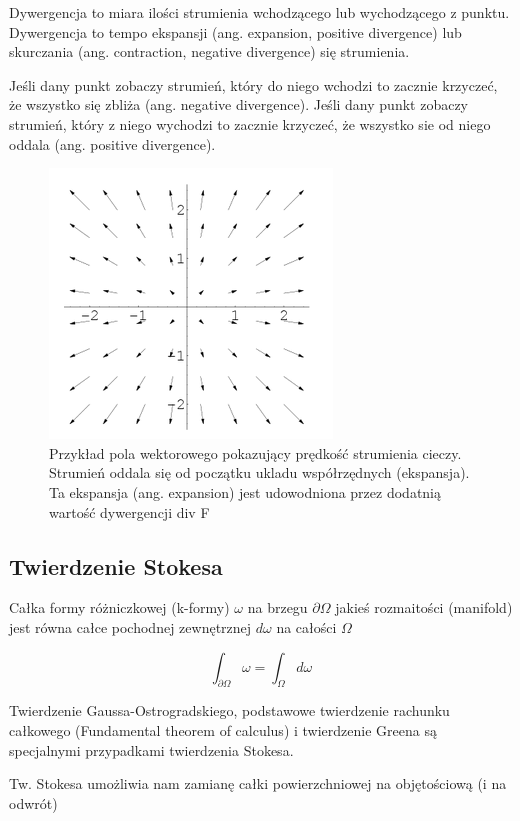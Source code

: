 \documentclass[12pt]{article}
\begin{document}
Dywergencja to miara ilości strumienia wchodzącego lub wychodzącego z punktu. Dywergencja to tempo ekspansji (ang. expansion, positive divergence) lub skurczania (ang. contraction, negative divergence) się strumienia.

Jeśli dany punkt zobaczy strumień, który do niego wchodzi to zacznie krzyczeć, że wszystko się zbliża (ang. negative divergence). Jeśli dany punkt zobaczy strumień, który z niego wychodzi to zacznie krzyczeć, że wszystko sie od niego oddala (ang. positive divergence).

\begin{figure}[H]
	\centering
	\includegraphics[scale=1.0]{Pictures/vector_field_div.png}
	\caption{Przykład pola wektorowego pokazujący prędkość strumienia cieczy. Strumień oddala się od początku ukladu współrzędnych (ekspansja). Ta ekspansja (ang. expansion) jest udowodniona przez dodatnią wartość dywergencji div F}
\end{figure}

\subsection{Twierdzenie Stokesa}
Całka formy różniczkowej (k-formy) $\omega$ na brzegu $\partial \Omega$ jakieś rozmaitości (manifold) jest równa całce pochodnej zewnętrznej $d \omega$ na całości $\Omega$

\begin{equation}
\int_{\partial \Omega} \omega = \int_{\Omega} d \omega
\end{equation}

Twierdzenie Gaussa-Ostrogradskiego, podstawowe twierdzenie rachunku całkowego (Fundamental theorem of calculus) i twierdzenie Greena są specjalnymi przypadkami twierdzenia Stokesa.

Tw. Stokesa umożliwia nam zamianę całki powierzchniowej na objętościową (i na odwrót)
\end{document}
